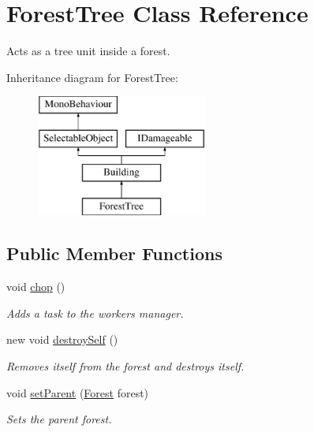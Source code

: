 \hypertarget{class_forest_tree}{}\section{Forest\+Tree Class Reference}
\label{class_forest_tree}


Acts as a tree unit inside a forest.  


Inheritance diagram for Forest\+Tree\+:\begin{figure}[H]
\begin{center}
\leavevmode
\includegraphics[height=4.000000cm]{class_forest_tree}
\end{center}
\end{figure}
\subsection*{Public Member Functions}
\begin{DoxyCompactItemize}
\item 
void \mbox{\hyperlink{class_forest_tree_abe30600ac2bcc9d846eaffab8f946f55}{chop}} ()
\begin{DoxyCompactList}\small\item\em Adds a task to the workers manager. \end{DoxyCompactList}\item 
new void \mbox{\hyperlink{class_forest_tree_a3c5ea72e5c35e793d3f1afa08e034058}{destroy\+Self}} ()
\begin{DoxyCompactList}\small\item\em Removes itself from the forest and destroys itself. \end{DoxyCompactList}\item 
void \mbox{\hyperlink{class_forest_tree_ac7f51574fc6e52629aee4fb8674feb6a}{set\+Parent}} (\mbox{\hyperlink{class_forest}{Forest}} forest)
\begin{DoxyCompactList}\small\item\em Sets the parent forest. \end{DoxyCompactList}\end{DoxyCompactItemize}
